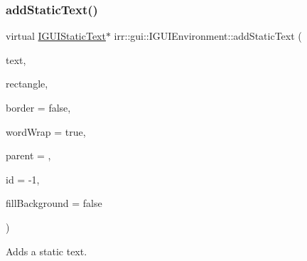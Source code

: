 \subsubsection{\texorpdfstring{add\+Static\+Text()}{addStaticText()}\hspace{0.1cm}{\footnotesize\ttfamily [1/2]}}
{\footnotesize\ttfamily virtual \hyperlink{classirr_1_1gui_1_1IGUIStaticText}{I\+G\+U\+I\+Static\+Text}$\ast$ irr\+::gui\+::\+I\+G\+U\+I\+Environment\+::add\+Static\+Text (\begin{DoxyParamCaption}\item[{const wchar\+\_\+t $\ast$}]{text,  }\item[{const \hyperlink{classirr_1_1core_1_1rect}{core\+::rect}$<$ \hyperlink{namespaceirr_ac66849b7a6ed16e30ebede579f9b47c6}{s32} $>$ \&}]{rectangle,  }\item[{bool}]{border = {\ttfamily false},  }\item[{bool}]{word\+Wrap = {\ttfamily true},  }\item[{\hyperlink{classirr_1_1gui_1_1IGUIElement}{I\+G\+U\+I\+Element} $\ast$}]{parent = {},  }\item[{\hyperlink{namespaceirr_ac66849b7a6ed16e30ebede579f9b47c6}{s32}}]{id = {\ttfamily -\/1},  }\item[{bool}]{fill\+Background = {\ttfamily false} }\end{DoxyParamCaption})\hspace{0.3cm}{\ttfamily [pure virtual]}}



Adds a static text. 



